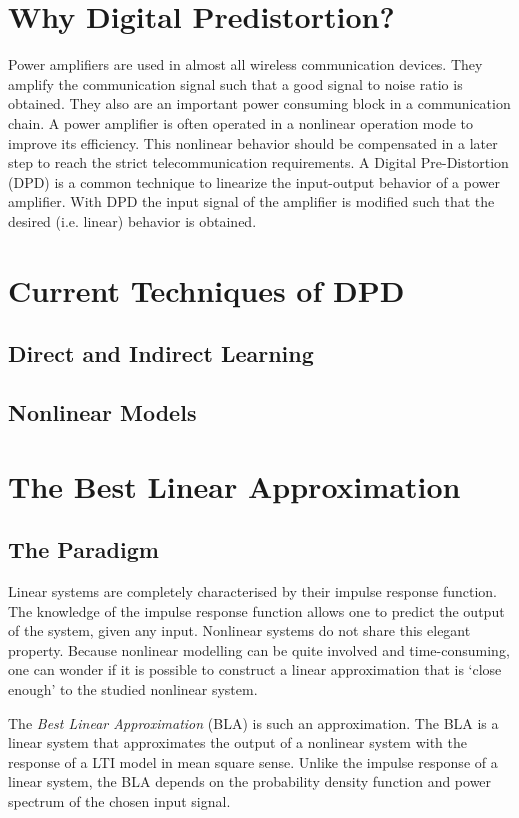 \section{Why Digital Predistortion?}
	
	Power amplifiers are used in almost all wireless communication devices. They amplify the communication signal such that a good signal to noise ratio is obtained. They also are an important power consuming block in a communication chain. A power amplifier is often operated in a nonlinear operation mode to improve its efficiency. This nonlinear behavior should be compensated in a later step to reach the strict telecommunication requirements.
	A Digital Pre-Distortion (DPD) is a common technique to linearize the input-output behavior of a power amplifier. With DPD the input signal of the amplifier is modified such that the desired (i.e. linear) behavior is obtained. 

\section{Current Techniques of DPD}
	\subsection{Direct and Indirect Learning}
	\subsection{Nonlinear Models}
\section{The Best Linear Approximation}

	\subsection{The Paradigm}

	Linear systems are completely characterised by their impulse response function. The knowledge of the impulse response function allows one to predict the output of the system, given any input. Nonlinear systems do not share this elegant property. Because nonlinear modelling can be quite involved and time-consuming, one can wonder if it is possible to construct a linear approximation that is `close enough' to the studied nonlinear system.

	The \emph{Best Linear Approximation} (BLA) is such an approximation. The BLA is a linear system that approximates the output of a nonlinear system with the response of a LTI model in mean square sense. Unlike the impulse response of a linear system, the BLA depends on the probability density function and power spectrum of the chosen input signal. 

